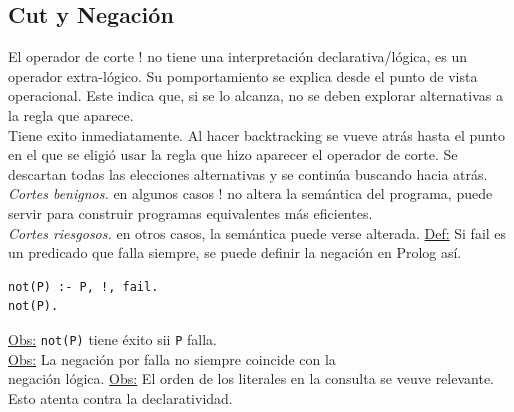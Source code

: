 \documentclass[12pt]{extarticle}
\def\definicion{\newline\underline{Def:} }
\def\observacion{\underline{Obs:} }
\begin{document}
\subsection{Cut y Negación}
El operador de corte ! no tiene una interpretación declarativa/lógica, es un operador extra-lógico. Su pomportamiento se explica desde el punto de vista operacional. Este indica que, si se lo alcanza, no se deben explorar alternativas a la regla que aparece. \\
Tiene exito inmediatamente. Al hacer backtracking se vueve atrás hasta el punto en el que se eligió usar la regla que hizo aparecer el operador de corte. Se descartan todas las elecciones alternativas y se continúa buscando hacia atrás. \\
\textit{Cortes benignos.} en algunos casos ! no altera la semántica del programa, puede servir para construir programas equivalentes más eficientes. \\
\textit{Cortes riesgosos.} en otros casos, la semántica puede verse alterada.
\definicion Si fail es un predicado que falla siempre, se puede definir la negación en Prolog así.
\begin{verbatim}
not(P) :- P, !, fail.
not(P).
\end{verbatim}
\observacion \verb|not(P)| tiene éxito sii \verb|P| falla. \\
\observacion La negación por falla no siempre coincide con la \\ negación lógica.
\observacion El orden de los literales en la consulta se veuve relevante. Esto atenta contra la declaratividad.
\end{document}
